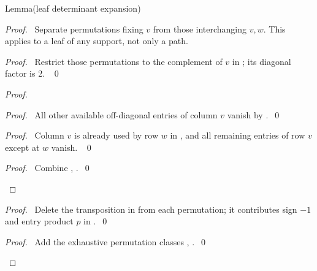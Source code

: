 \begin{namedresult}{Lemma}{(leaf determinant expansion)}\label{lem:rem-leaf-det}
\end{namedresult}
\begin{proof}
\pfsketch\ Separate permutations fixing $v$ from those interchanging
$v,w$. This applies to a leaf of any support, not only a path.
\begin{proof}\pf\ Restrict those permutations to the complement of $v$
in ; its diagonal factor is 2. ~\qed\end{proof}
\begin{proof}
\begin{proof}\pf\ All other available off-diagonal entries of column
$v$ vanish by .~\qed\end{proof}
\begin{proof}\pf\ Column $v$ is already used by row $w$ in
, and all remaining entries of row $v$ except at $w$ vanish. ~\qed\end{proof}
\qedstep
\begin{proof}\pf\ Combine , .~\qed\end{proof}
\end{proof}
\begin{proof}\pf\ Delete the transposition in 
from each permutation; it contributes sign $-1$ and entry product $p$
in .~\qed\end{proof}
\qedstep
\begin{proof}\pf\ Add the exhaustive permutation classes
, .~\qed\end{proof}
\end{proof}


